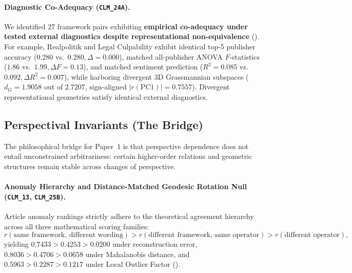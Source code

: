 \paragraph{Diagnostic Co-Adequacy (\texttt{CLM\_24A}).}
We identified 27 framework pairs exhibiting \textbf{empirical co-adequacy under tested external diagnostics despite representational non-equivalence} (). For example, Realpolitik and Legal Culpability exhibit identical top-5 publisher accuracy ($0.280$ vs.\ $0.280, \Delta = 0.000$), matched all-publisher ANOVA $F$-statistics ($1.86$ vs.\ $1.99, \Delta F = 0.13$), and matched sentiment prediction ($R^2 = 0.085$ vs.\ $0.092, \Delta R^2 = 0.007$), while harboring divergent 3D Grassmannian subspaces ($d_G = \mathbf{1.9058}$ out of $2.7207$, sign-aligned $|r(\mathrm{PC1})| = 0.7557$). Divergent representational geometries satisfy identical external diagnostics.

\subsection{Perspectival Invariants (The Bridge)}
\label{sec:perspectival_invariants}

The philosophical bridge for Paper~1 is that perspective dependence does not entail unconstrained arbitrariness: certain higher-order relations and geometric structures remain stable across changes of perspective.

\paragraph{Anomaly Hierarchy and Distance-Matched Geodesic Rotation Null (\texttt{CLM\_13}, \texttt{CLM\_25B}).}
Article anomaly rankings strictly adhere to the theoretical agreement hierarchy across all three mathematical scoring families:
\begin{equation}
    r(\text{same framework, different wording}) > r(\text{different framework, same operator}) > r(\text{different operator}),
\end{equation}
yielding $0.7433 > 0.4253 > 0.0200$ under reconstruction error, $0.8036 > 0.4706 > 0.0658$ under Mahalanobis distance, and $0.5963 > 0.2287 > 0.1217$ under Local Outlier Factor ().

